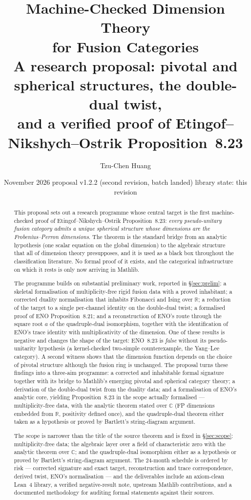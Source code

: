 \documentclass[11pt,a4paper]{article}
\title{\vspace{-1.2cm}\textbf{Machine-Checked Dimension Theory\\ for Fusion Categories}\\[0.35cm]
\large A research proposal: pivotal and spherical structures, the double-dual twist,\\ and a verified proof of Etingof--Nikshych--Ostrik Proposition~8.23}
\author{Tzu-Chen Huang}
\date{November 2026 \quad\textbar\quad proposal v1.2.2 (second revision, batch landed) \quad\textbar\quad library state: this revision}
\theoremstyle{remark}
\newcommand{\R}{\mathbb{R}}
\newcommand{\Cx}{\mathbb{C}}
\begin{document}
\maketitle

\begin{abstract}
\noindent
This proposal sets out a research programme whose central target is the first machine-checked
proof of Etingof--Nikshych--Ostrik Proposition~8.23: \emph{every pseudo-unitary fusion
category admits a unique spherical structure whose dimensions are the Frobenius--Perron
dimensions}. The theorem is the standard bridge from an analytic hypothesis (one scalar
equation on the global dimension) to the algebraic structure that all of dimension theory
presupposes, and it is used as a black box throughout the classification literature. No
formal proof of it exists, and the categorical infrastructure on which it rests is only now
arriving in Mathlib.

The programme builds on substantial preliminary work, reported in \S\ref{sec:prelim}: a
skeletal formalisation of multiplicity-free rigid fusion data with a proved inhabitant; a
corrected duality normalisation that inhabits Fibonacci and Ising over $\R$; a reduction of
the target to a single per-channel identity on the double-dual twist; a formalised proof of
ENO Proposition~8.21; and a reconstruction of ENO's route through the square root $a$ of the
quadruple-dual isomorphism, together with the identification of ENO's trace identity with
multiplicativity of the dimension. One of these results is negative and changes the shape of
the target: ENO~8.23 is \emph{false} without its pseudo-unitarity hypothesis (a kernel-checked
two-simple counterexample, the Yang--Lee category). A second witness shows that the dimension
function depends on the choice of pivotal structure although the fusion ring is unchanged.
The proposal turns these findings into a three-aim programme: a corrected and inhabitable
formal signature together with its bridge to Mathlib's emerging pivotal and spherical
category theory; a derivation of the double-dual twist from the duality data; and a
formalisation of ENO's analytic core, yielding Proposition~8.23 in the scope actually
formalised --- multiplicity-free data, with the analytic theorem stated over $\Cx$ (FP
dimensions embedded from $\R$, positivity defined once), and the quadruple-dual theorem
either taken as a hypothesis or proved by Bartlett's string-diagram argument.

The scope is narrower than the title of the source theorem and is fixed in \S\ref{sec:scope}:
multiplicity-free data; the algebraic layer over a field of characteristic zero with the
analytic theorem over $\Cx$; and the quadruple-dual isomorphism either
as a hypothesis or proved by Bartlett's string-diagram argument. The 24-month schedule is ordered
by risk --- corrected signature and exact target, reconstruction and trace correspondence, derived
twist, ENO's normalisation --- and the deliverables include an axiom-clean Lean~4 library, a
verified negative-result note, upstream Mathlib contributions, and a documented methodology for
auditing formal statements against their sources.

\end{abstract}
\end{document}
